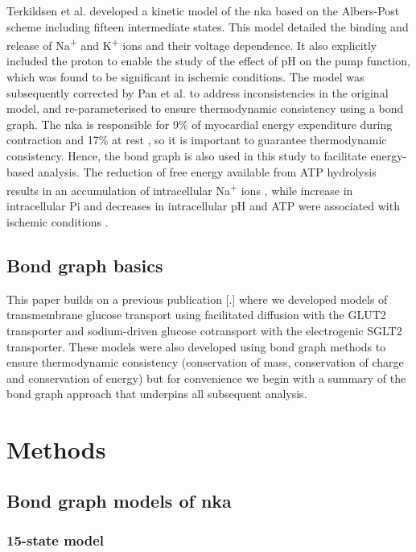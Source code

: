 \documentclass{biophys-new}
\begin{document}
Terkildsen et al. \cite{terkildsen_balance_2007} developed a kinetic model of the \Gls{nka} based on the Albers-Post scheme including fifteen intermediate states.
This model detailed the binding and release of Na\textsuperscript{+} and K\textsuperscript{+} ions and their voltage dependence.
It also explicitly included the proton to enable the study of the effect of pH on the pump function,
which was found to be significant in ischemic conditions.
The model was subsequently corrected by Pan et al. \cite{pan_cardiac_2020} to address inconsistencies in the original model,
and re-parameterised to ensure thermodynamic consistency using a bond graph.
The \Gls{nka} is responsible for 9\% of myocardial energy expenditure during contraction and 17\% at rest \cite{schramm1994energy},
so it is important to guarantee thermodynamic consistency.
Hence, the bond graph is also used in this study to facilitate energy-based analysis.
The reduction of free energy available from ATP hydrolysis results in an accumulation of intracellular Na\textsuperscript{+} ions \cite{jansen2003energy},
while increase in intracellular Pi and decreases in intracellular pH and ATP were associated with ischemic conditions \cite{huang1984regulation}.

\subsection*{Bond graph basics}

This paper builds on a previous publication {[}.{]} where we developed
models of transmembrane glucose transport using facilitated diffusion
with the GLUT2 transporter and sodium-driven glucose cotransport with
the electrogenic SGLT2 transporter. These models were also developed
using bond graph methods to ensure thermodynamic consistency
(conservation of mass, conservation of charge and conservation of
energy) but for convenience we begin with a summary of the bond graph
approach that underpins all subsequent analysis.


\section*{Methods}


\subsection*{Bond graph models of \Gls{nka}}

\subsubsection{15-state model}
\end{document}
